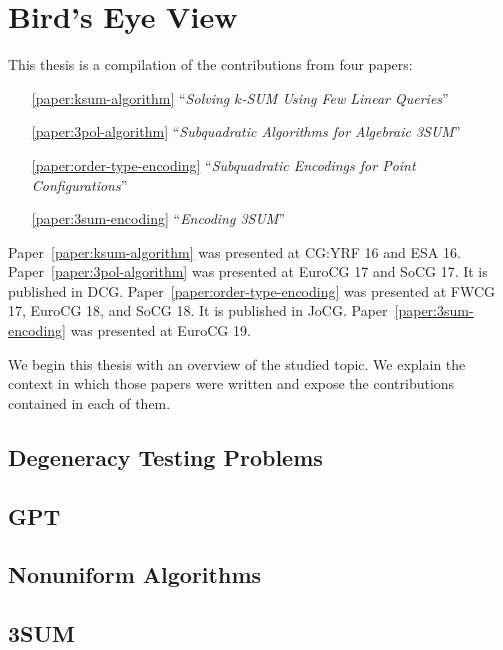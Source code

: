 \chapter{\done Bird's Eye View}



This thesis is a compilation of the contributions from four papers:
%
\begin{enumerate}
	\item[\ref{paper:ksum-algorithm}] ``\emph{Solving \(k\)-SUM Using Few Linear Queries}''~\cite{CIO16}
	\item[\ref{paper:3pol-algorithm}] ``\emph{Subquadratic Algorithms for Algebraic 3SUM}''~\cite{BCILOS19}
	\item[\ref{paper:order-type-encoding}] ``\emph{Subquadratic Encodings for Point Configurations}''~\cite{CCILO19}
	\item[\ref{paper:3sum-encoding}] ``\emph{Encoding 3SUM}''~\cite{CCILMO19}
\end{enumerate}
%
Paper~\ref{paper:ksum-algorithm} was presented at CG:YRF 16 and ESA 16.
%
Paper~\ref{paper:3pol-algorithm} was presented at EuroCG 17 and SoCG 17. It is published in DCG.
%
Paper~\ref{paper:order-type-encoding} was presented at FWCG 17, EuroCG 18, and SoCG 18. It is published in JoCG.
%
Paper~\ref{paper:3sum-encoding} was presented at EuroCG 19.

We begin this thesis with an overview of the studied topic.
%
We explain the context in which those papers were written and expose
the contributions contained in each of them.

\section*{Degeneracy Testing Problems}


\section*{GPT}


\section*{Nonuniform Algorithms}


\section*{3SUM}


